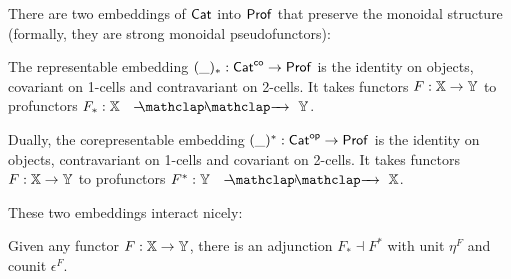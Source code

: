 There are two embeddings of ${\sf Cat}$ into ${\sf Prof}$ that preserve the monoidal structure (formally, they are strong monoidal pseudofunctors):

\begin{definition}
The representable embedding $(\_)_*:{\sf Cat}^{\mathsf{co}} \to {\sf Prof}$ is the identity on objects,  covariant on 1-cells and contravariant on 2-cells.  It takes functors $F:\mathbb{X}\to \mathbb{Y}$ to profunctors  $F_*:\X\proarrow \Y$.


Dually, the corepresentable embedding $(\_)^*:{\sf Cat}^{\mathsf{op}} \to {\sf Prof}$  is the identity on objects, contravariant on 1-cells and covariant on 2-cells. It takes functors $F:\mathbb{X}\to \mathbb{Y}$ to profunctors  $F^*:\Y\proarrow \X$.

\end{definition}

These two embeddings interact nicely:

\begin{lemma}
Given any functor $F:\mathbb{X}\to \mathbb{Y}$, there is an adjunction $F_* \dashv F^*$ with unit $\eta^F$ and counit $\epsilon^F$.
\end{lemma}


